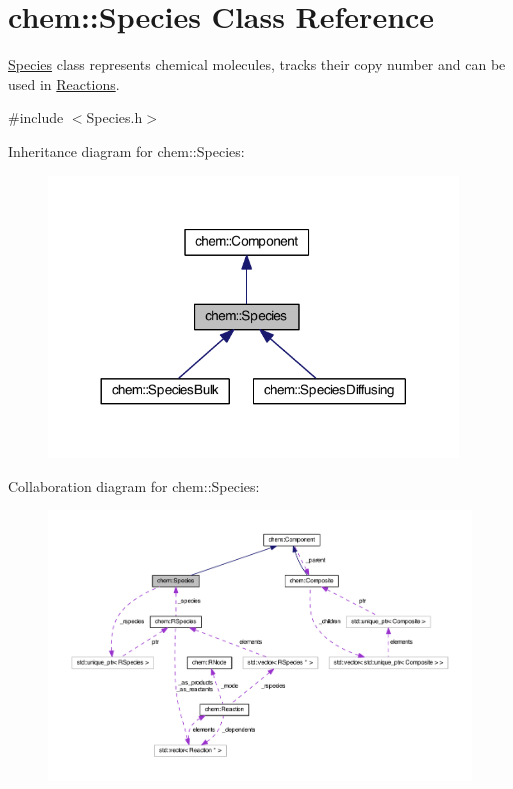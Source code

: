 \hypertarget{classchem_1_1Species}{\section{chem\-:\-:Species Class Reference}
\label{classchem_1_1Species}
}


\hyperlink{classchem_1_1Species}{Species} class represents chemical molecules, tracks their copy number and can be used in \hyperlink{classchem_1_1Reaction}{Reactions}.  




{\ttfamily \#include $<$Species.\-h$>$}



Inheritance diagram for chem\-:\-:Species\-:
\nopagebreak
\begin{figure}[H]
\begin{center}
\leavevmode
\includegraphics[width=308pt]{classchem_1_1Species__inherit__graph}
\end{center}
\end{figure}


Collaboration diagram for chem\-:\-:Species\-:
\nopagebreak
\begin{figure}[H]
\begin{center}
\leavevmode
\includegraphics[width=350pt]{classchem_1_1Species__coll__graph}
\end{center}
\end{figure}
